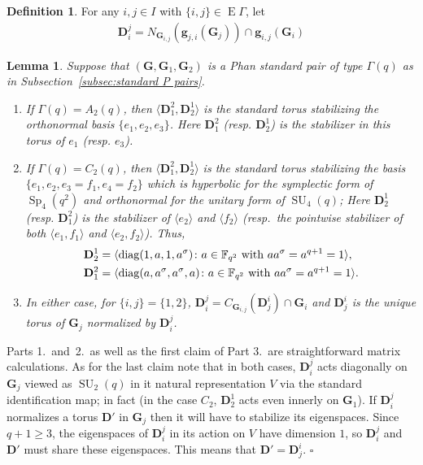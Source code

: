 \documentclass[12pt]{amsart}
\newtheorem{lemma}[theorem]{Lemma}
\theoremstyle{definition}
\newtheorem{definition}[theorem]{Definition}
\newcommand{\bpf}{\noindent{\bf Proof}\hspace{7pt}}
\newcommand{\epf}{\qed}
\newcommand{\ble}{\begin{lemma}}
\newcommand{\ele}{\end{lemma}}
\newcommand{\bde}{\begin{definition}}
\newcommand{\ede}{\end{definition}}
\newcommand{\diag}{\mathop{\rm diag}\nolimits}
\newcommand{\FF}{{\mathbb F}}
\DeclareMathOperator{\SU}{SU}
\DeclareMathOperator{\Sp}{Sp}
\renewcommand{\qed}{\hfill $\square$}
\newcommand{\amgrpD}{{\mathbf{D}}}
\newcommand{\amgrpG}{{\mathbf{G}}}
\newcommand{\amg}{{\mathbf g}}
\DeclareMathOperator{\edg}{E}
\newcommand{\liediag}{\Gamma}
\begin{document}
\bde\label{dfn:tori in phan amalgam}
For any $i,j\in I$ with $\{i,j\}\in \edg\liediag$, let 
\begin{align*}
\amgrpD_i^j=N_{\amgrpG_{i,j}}(\amg_{j,i}(\amgrpG_j))\cap \amg_{i,j}(\amgrpG_i)
\end{align*}
\ede
\ble\label{lem:tori in phan standard pairs}
Suppose that $(\amgrpG,\amgrpG_1,\amgrpG_2)$ is a Phan standard pair of type 
$\liediag(q)$ as in Subsection~\ref{subsec:standard P pairs}. 
\begin{enumerate}
\item If $\liediag(q)=A_2(q)$, then $\langle \amgrpD_1^2, \amgrpD_2^1\rangle$ is the standard torus stabilizing the orthonormal basis $\{e_1,e_2,e_3\}$. Here $\amgrpD_1^2$ (resp. $\amgrpD_2^1$) is the stabilizer in this torus of $e_1$ (resp. $e_3$).
\item If $\liediag(q)=C_2(q)$, then $\langle \amgrpD_1^2,\amgrpD_2^1\rangle$ is the standard torus stabilizing the 
 basis $\{e_1,e_2,e_3=f_1,e_4=f_2\}$ which is hyperbolic for the symplectic form of $\Sp_4(q^2)$ and orthonormal for the unitary form of $\SU_4(q)$; Here $\amgrpD_2^1$ (resp. $\amgrpD_1^2$) is the stabilizer of $\langle e_2\rangle$ and $\langle f_2\rangle$ (resp.~the pointwise stabilizer of both $\langle e_1,f_1\rangle$ and $\langle e_2,f_2\rangle$).
Thus, 
\begin{align*}
\amgrpD_2^1&=\langle\diag(1,a,1,a^\sigma)\colon a\in \FF_{q^2}\mbox{ with }aa^\sigma=a^{q+1}=1\rangle,\\
\amgrpD_1^2&=\langle\diag(a,a^\sigma,a^\sigma,a )\colon a\in \FF_{q^2}\mbox{ with }aa^\sigma=a^{q+1}=1\rangle.
\end{align*}
\item In either case, for $\{i,j\}=\{1,2\}$,  $\amgrpD_i^j=C_{\amgrpG_{i,j}}(\amgrpD_j^i)\cap\amgrpG_i$ and 
 $\amgrpD_j^i$ is the unique torus of $\amgrpG_j$ normalized by $\amgrpD_i^j$. 
\end{enumerate}
\ele
\bpf
Parts 1.~and~2.~as well as the first claim of Part 3.~are straightforward matrix calculations.
As for the last claim note that in both cases, $\amgrpD_i^j$ acts diagonally on $\amgrpG_j$ viewed as $\SU_2(q)$ in it natural representation $V$ via the standard identification map; in fact  (in the case $C_2$, $\amgrpD_2^1$ acts even innerly on $\amgrpG_1$).
If $\amgrpD_i^j$ normalizes a torus $\amgrpD'$ in $\amgrpG_j$ then it will have to stabilize its eigenspaces.
Since $q+1\ge 3$, the eigenspaces of $\amgrpD_i^j$ in its action on $V$ have dimension $1$, so $\amgrpD_i^j$ and $\amgrpD'$ must share these eigenspaces. This means that $\amgrpD'=\amgrpD_j^i$.
\epf
\end{document}
